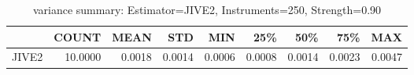 \begin{table}[ht]
\centering
\caption{variance summary: Estimator=JIVE2, Instruments=250, Strength=0.90}
\begin{tabular}{lrrrrrrrr}
\toprule
 & COUNT & MEAN & STD & MIN & 25\% & 50\% & 75\% & MAX \\
\midrule
JIVE2 & 10.0000 & 0.0018 & 0.0014 & 0.0006 & 0.0008 & 0.0014 & 0.0023 & 0.0047 \\
\bottomrule
\end{tabular}
\end{table}
